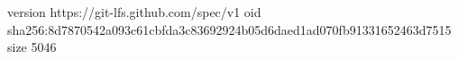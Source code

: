 version https://git-lfs.github.com/spec/v1
oid sha256:8d7870542a093c61cbfda3c83692924b05d6daed1ad070fb91331652463d7515
size 5046
